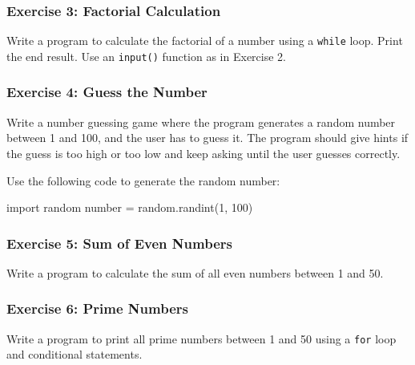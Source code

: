 \documentclass[
  letterpaper,
  DIV=11,
  numbers=noendperiod]{scrreprt}
\newenvironment{Shaded}{\begin{snugshade}}{\end{snugshade}}
\newcommand{\DecValTok}[1]{\textcolor[rgb]{0.68,0.00,0.00}{#1}}
\newcommand{\ImportTok}[1]{\textcolor[rgb]{0.00,0.46,0.62}{#1}}
\newcommand{\NormalTok}[1]{\textcolor[rgb]{0.00,0.23,0.31}{#1}}
\newcommand{\OperatorTok}[1]{\textcolor[rgb]{0.37,0.37,0.37}{#1}}
\begin{document}
\hypertarget{exercise-3-factorial-calculation}{%
\subsubsection{Exercise 3: Factorial
Calculation}\label{exercise-3-factorial-calculation}}

Write a program to calculate the factorial of a number using a
\texttt{while} loop. Print the end result. Use an \texttt{input()}
function as in Exercise 2.

\hypertarget{exercise-4-guess-the-number}{%
\subsubsection{Exercise 4: Guess the
Number}\label{exercise-4-guess-the-number}}

Write a number guessing game where the program generates a random number
between 1 and 100, and the user has to guess it. The program should give
hints if the guess is too high or too low and keep asking until the user
guesses correctly.

Use the following code to generate the random number:

\begin{Shaded}
\begin{Highlighting}[]
\ImportTok{import}\NormalTok{ random}
\NormalTok{number }\OperatorTok{=}\NormalTok{ random.randint(}\DecValTok{1}\NormalTok{, }\DecValTok{100}\NormalTok{)}
\end{Highlighting}
\end{Shaded}

\hypertarget{exercise-5-sum-of-even-numbers}{%
\subsubsection{Exercise 5: Sum of Even
Numbers}\label{exercise-5-sum-of-even-numbers}}

Write a program to calculate the sum of all even numbers between 1 and
50.

\hypertarget{exercise-6-prime-numbers}{%
\subsubsection{Exercise 6: Prime
Numbers}\label{exercise-6-prime-numbers}}

Write a program to print all prime numbers between 1 and 50 using a
\texttt{for} loop and conditional statements.

\end{document}
